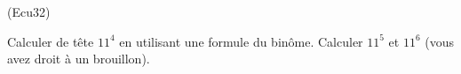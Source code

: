 \begin{tiny}(Ecu32)\end{tiny} Calculer de tête $11^4$ en utilisant une formule du binôme. Calculer $11^5$ et $11^6$ (vous avez droit à un brouillon).
